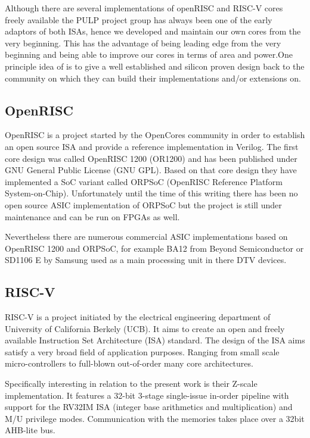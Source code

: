 Although there are several implementations of openRISC and RISC-V cores freely available the PULP project group has always been one of the early adaptors of both ISAs, hence we developed and maintain our own cores from the very beginning. This has the advantage of being leading edge from the very beginning and being able to improve our cores in terms of area and power.One principle idea of \pulpino is to give a well established and silicon proven design back to the community on which they can build their implementations and/or extensions on.

\subsection{OpenRISC}

OpenRISC is a project started by the OpenCores community in order to establish an open source ISA and provide a reference implementation in Verilog. The first core design was called OpenRISC 1200 (OR1200) and has been published under GNU General Public License (GNU GPL). Based on that core design they have implemented a SoC variant called ORPSoC (OpenRISC Reference Platform System-on-Chip). Unfortunately until the time of this writing there has been no open source ASIC implementation of ORPSoC but the project is still under maintenance and can be run on FPGAs as well.

Nevertheless there are numerous commercial ASIC implementations based on OpenRISC 1200 and ORPSoC, for example BA12 from Beyond Semiconductor or SD1106 E by Samsung used as a main processing unit in there \gls{DTV} devices.

\subsection{RISC-V}

RISC-V is a project initiated by the electrical engineering department of University of California Berkely (UCB). It aims to create an open and freely available Instruction Set Architecture (ISA) standard. The design of the ISA aims satisfy a very broad field of application purposes. Ranging from small scale micro-controllers to full-blown out-of-order many core architectures.

Specifically interesting in relation to the present work is their Z-scale implementation. It features a 32-bit 3-stage single-issue in-order pipeline with support for the RV32IM ISA (integer base arithmetics and multiplication) and M/U privilege modes. Communication with the memories takes place over a 32bit AHB-lite bus.

